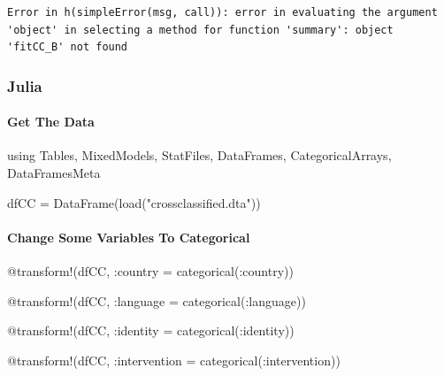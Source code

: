 \documentclass[
  letterpaper,
  DIV=11,
  numbers=noendperiod]{scrreprt}
\let\oldparagraph\paragraph
\renewcommand{\paragraph}[1]{\oldparagraph{#1}\mbox{}}
\newenvironment{Shaded}{\begin{snugshade}}{\end{snugshade}}
\newcommand{\BuiltInTok}[1]{\textcolor[rgb]{0.00,0.23,0.31}{#1}}
\newcommand{\FunctionTok}[1]{\textcolor[rgb]{0.28,0.35,0.67}{#1}}
\newcommand{\ImportTok}[1]{\textcolor[rgb]{0.00,0.46,0.62}{#1}}
\newcommand{\NormalTok}[1]{\textcolor[rgb]{0.00,0.23,0.31}{#1}}
\newcommand{\OperatorTok}[1]{\textcolor[rgb]{0.37,0.37,0.37}{#1}}
\newcommand{\PreprocessorTok}[1]{\textcolor[rgb]{0.68,0.00,0.00}{#1}}
\newcommand{\StringTok}[1]{\textcolor[rgb]{0.13,0.47,0.30}{#1}}
\begin{document}
\begin{verbatim}
Error in h(simpleError(msg, call)): error in evaluating the argument 'object' in selecting a method for function 'summary': object 'fitCC_B' not found
\end{verbatim}

\subsubsection{Julia}

\paragraph{Get The Data}\label{get-the-data-13}

\begin{Shaded}
\begin{Highlighting}[]
\ImportTok{using} \BuiltInTok{Tables}\NormalTok{, }\BuiltInTok{MixedModels}\NormalTok{, }\BuiltInTok{StatFiles}\NormalTok{, }\BuiltInTok{DataFrames}\NormalTok{, }\BuiltInTok{CategoricalArrays}\NormalTok{, }\BuiltInTok{DataFramesMeta}

\NormalTok{dfCC }\OperatorTok{=} \FunctionTok{DataFrame}\NormalTok{(}\FunctionTok{load}\NormalTok{(}\StringTok{"crossclassified.dta"}\NormalTok{))}
\end{Highlighting}
\end{Shaded}

\paragraph{Change Some Variables To
Categorical}\label{change-some-variables-to-categorical-8}

\begin{Shaded}
\begin{Highlighting}[]
\PreprocessorTok{@transform}\NormalTok{!(dfCC, }\OperatorTok{:}\NormalTok{country }\OperatorTok{=} \FunctionTok{categorical}\NormalTok{(}\OperatorTok{:}\NormalTok{country))}

\PreprocessorTok{@transform}\NormalTok{!(dfCC, }\OperatorTok{:}\NormalTok{language }\OperatorTok{=} \FunctionTok{categorical}\NormalTok{(}\OperatorTok{:}\NormalTok{language))}

\PreprocessorTok{@transform}\NormalTok{!(dfCC, }\OperatorTok{:}\NormalTok{identity }\OperatorTok{=} \FunctionTok{categorical}\NormalTok{(}\OperatorTok{:}\NormalTok{identity))}

\PreprocessorTok{@transform}\NormalTok{!(dfCC, }\OperatorTok{:}\NormalTok{intervention }\OperatorTok{=} \FunctionTok{categorical}\NormalTok{(}\OperatorTok{:}\NormalTok{intervention))}
\end{Highlighting}
\end{Shaded}
\end{document}
